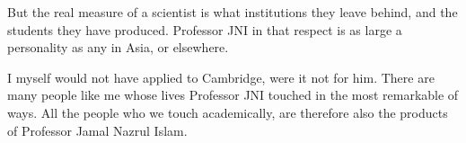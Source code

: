 \documentclass[a4paper,11pt]{article}
\begin{document}
But the real measure of a scientist is what institutions they leave behind, and the students they have produced. Professor JNI in that respect is as large a personality as any in Asia, or elsewhere.

I myself would not have applied to Cambridge, were it not for him. There are many people like me whose lives Professor JNI touched in the most remarkable of ways. All the people who we touch academically, are therefore also the products of Professor Jamal Nazrul Islam.

 
 
 
 
\end{document}
